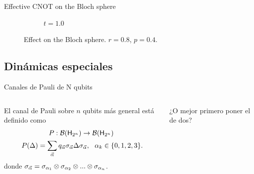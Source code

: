 \begin{frame}{Effective CNOT on the Bloch sphere}
\begin{figure}[h!]
\begin{subfigure}{0.32\textwidth}
            \caption{$t=1.0$}
        \end{subfigure}
        \caption{Effect on the Bloch sphere. $r=0.8$, $p=0.4$.}
    \end{figure}
\end{frame}


\subsection{Dinámicas especiales}

\begin{frame}{Canales de Pauli de N qubits}
    \begin{columns}
        \begin{column}{0.5\textwidth}
            El canal de Pauli sobre $n$ qubits más general está definido como
\begin{equation}\label{eq:PauliChannelN}
    \begin{gathered}
    P:\mcB(\hilbert_{2^{n}}) \rightarrow \mcB(\hilbert_{2^{n}})\nonumber\\
    P(\Delta)=\sum_{\vec{\alpha}}q_{\vec{\alpha}}\pauli{\vec{\alpha}}\Delta\pauli{\vec{\alpha}}, \,\text{ }\, \alpha_{k}\in\{0,1,2,3\} \rlap{.}
    \end{gathered}
\end{equation}
donde  $\sigma_{\vec{\alpha}}=\sigma_{\alpha_{1}}\otimes\sigma_{\alpha_{2}}\otimes...\otimes \sigma_{\alpha_{n}}$.
        \end{column}
        \begin{column}{0.5\textwidth}
            ¿O mejor primero poner el de dos?
        \end{column}
    \end{columns}
\end{frame}


